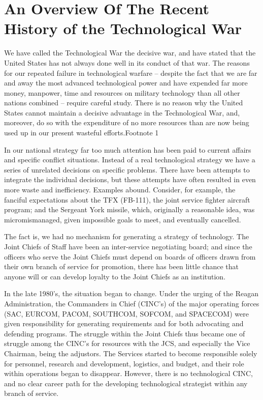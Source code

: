 \chapter{An Overview Of The Recent History of the Technological War}

We have called the Technological War the decisive war, and have stated that the United States has not always done well in its conduct of that war. The reasons for our repeated failure in technological warfare -- despite the fact that we are far and away the most advanced technological power and have expended far more money, manpower, time and resources on military technology than all other nations combined -- require careful study. There is no reason why the United States cannot maintain a decisive advantage in the Technological War, and, moreover, do so with the expenditure of no more resources than are now being used up in our present wasteful efforts.Footnote 1

In our national strategy far too much attention has been paid to current affairs and specific conflict situations. Instead of a real technological strategy we have a series of unrelated decisions on specific problems. There have been attempts to integrate the individual decisions, but these attempts have often resulted in even more waste and inefficiency. Examples abound. Consider, for example, the fanciful expectations about the TFX (FB-111), the joint service fighter aircraft program; and the Sergeant York missile, which, originally a reasonable idea, was micromismanaged, given impossible goals to meet, and eventually cancelled.

The fact is, we had no mechanism for generating a strategy of technology. The Joint Chiefs of Staff have been an inter-service negotiating board; and since the officers who serve the Joint Chiefs must depend on boards of officers drawn from their own branch of service for promotion, there has been little chance that anyone will or can develop loyalty to the Joint Chiefs as an institution.

In the late 1980's, the situation began to change. Under the urging of the Reagan Administration, the Commanders in Chief (CINC's) of the major operating forces (SAC, EURCOM, PACOM, SOUTHCOM, SOFCOM, and SPACECOM) were given responsibility for generating requirements and for both advocating and defending programs. The struggle within the Joint Chiefs thus became one of struggle among the CINC's for resources with the JCS, and especially the Vice Chairman, being the adjustors. The Services started to become responsible solely for personnel, research and development, logistics, and budget, and their role within operations began to disappear. However, there is no technological CINC, and no clear career path for the developing technological strategist within any branch of service.

